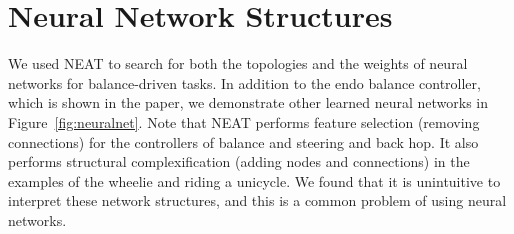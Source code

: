 \section{Neural Network Structures}
We used NEAT to search for both the topologies and the weights of neural networks for balance-driven tasks. In addition to the endo balance controller, which is shown in the paper, we demonstrate other learned neural networks in Figure~\ref{fig:neuralnet}. Note that NEAT performs feature selection (removing connections) for the controllers of balance and steering and back hop. It also performs structural complexification (adding nodes and connections) in the examples of the wheelie and riding a unicycle. We found that it is unintuitive to interpret these network structures, and this is a common problem of using neural networks.

